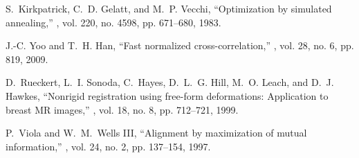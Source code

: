 \documentclass{article}
\begin{document}
\begin{thebibliography}{10}
S.~Kirkpatrick, C.~D. Gelatt, and M.~P. Vecchi,
\newblock ``Optimization by simulated annealing,''
, vol. 220, no. 4598, pp. 671--680, 1983.

J.-C. Yoo and T.~H. Han,
\newblock ``Fast normalized cross-correlation,''
, vol. 28, no. 6, pp. 819, 2009.

D.~Rueckert, L.~I. Sonoda, C.~Hayes, D.~L.~G. Hill, M.~O. Leach, and D.~J.
Hawkes,
\newblock ``Nonrigid registration using free-form deformations: Application to breast {MR} images,''
, vol. 18, no. 8, pp. 712--721, 1999.

P.~Viola and W.~M.~Wells III,
\newblock ``Alignment by maximization of mutual information,''
, vol. 24, no. 2, pp. 137--154, 1997.
\end{thebibliography}
\end{document}
